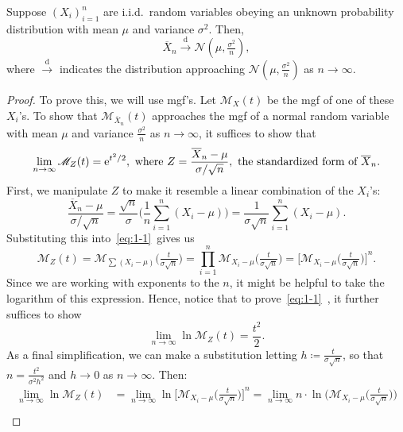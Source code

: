 \begin{theorem}
    Suppose \({(X_i)}_{i=1}^n\) are i.i.d.\ random variables obeying an unknown probability distribution with mean \(\mu\) and variance \(\sigma^2\). 
    Then, \[\overline{X}_n \overset{\mathrm{d}}{\longrightarrow} \mathscr{N}(\mu, \tfrac{\sigma^2}{n}),\]
    where \(\overset{\mathrm{d}}{\longrightarrow}\) indicates the distribution approaching \(\mathscr{N}(\mu, \frac{\sigma^2}{n})\) as \(n\to\infty\).
\end{theorem}

\begin{proof}
    To prove this, we will use mgf's. 
    Let \(\mathscr{M}_{X}(t)\) be the mgf of one of these \(X_i\)'s. 
    To show that \(\mathscr{M}_{\overline{X}_n}(t) \) approaches the mgf of a normal random variable with mean \(\mu\) and variance \(\frac{\sigma^2}{n}\) as \(n\to\infty\), it suffices to show that\begin{equation}\label{eq:1-1}
        \lim_{n\to\infty} \mathscr{M}_Z(t) = \mathrm{e}^{t^2 / 2},~\text{where}~Z= \frac{\overline{X}_n - \mu}{\sigma / \sqrt{n}},~\text{the standardized form of}~\overline{X}_n. 
    \end{equation}
    First, we manipulate \(Z\) to make it resemble a linear combination of the \(X_i\)'s:\[
    \frac{\overline{X}_n - \mu}{\sigma / \sqrt{n}} = \frac{\sqrt{n}}{\sigma} \bigg(\frac{1}{n}\sum_{i=1}^n (X_i - \mu)\bigg) = \frac{1}{\sigma\sqrt{n}} \sum_{i=1}^n (X_i - \mu). 
    \]Substituting this into~\eqref{eq:1-1}~gives us\[
    \mathscr{M}_Z(t) = \mathscr{M}_{\sum (X_i - \mu)}\big(\tfrac{t}{\sigma \sqrt{n}}\big) = \prod_{i=1}^n \mathscr{M}_{X_i - \mu}\big(\tfrac{t}{\sigma\sqrt{n}}\big) = {\Big[\mathscr{M}_{X_i - \mu}\big(\tfrac{t}{\sigma\sqrt{n}}\big)\Big]}^n.\]
    Since we are working with exponents to the \(n\), it might be helpful to take the logarithm of this expression. 
    Hence, notice that to prove~\eqref{eq:1-1}~, it further suffices to show\[
    \lim_{n\to\infty} \ln \mathscr{M}_Z(t) = \frac{t^2}{2}. 
    \]As a final simplification, we can make a substitution letting \(h\coloneq \frac{t}{\sigma\sqrt{n}}\), so that \(n = \frac{t^2}{\sigma^2 h^2}\) and \(h\to 0\) as \(n\to \infty\). 
    Then:\begin{align*}
    \lim_{n\to\infty} \ln \mathscr{M}_Z(t) &= \lim_{n\to\infty} \ln {\Big[\mathscr{M}_{X_i - \mu}\big(\tfrac{t}{\sigma\sqrt{n}}\big)\Big]}^n = \lim_{n\to\infty} n\cdot \ln \Big(\mathscr{M}_{X_i -\mu}\big(\tfrac{t}{\sigma\sqrt{n}}\big) \Big)\\

\end{align*}
\end{proof}
